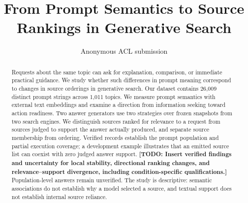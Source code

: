 \documentclass[11pt]{article}
\title{From Prompt Semantics to Source Rankings in Generative Search}
\author{Anonymous ACL submission}
\newcommand{\todo}[1]{\textcolor{black!72}{\textbf{[TODO: #1]}}}
\begin{document}
\maketitle
\begin{abstract}
Requests about the same topic can ask for explanation, comparison, or immediate practical guidance. We study whether such differences in prompt meaning correspond to changes in source orderings in generative search. Our dataset contains 26,009 distinct prompt strings across 1,011 topics. We measure prompt semantics with external text embeddings and examine a direction from information seeking toward action readiness. Two answer generators use two strategies over frozen snapshots from two search engines. We distinguish sources ranked for relevance to a request from sources judged to support the answer actually produced, and separate source membership from ordering. Verified records establish the prompt population and partial execution coverage; a development example illustrates that an emitted source list can coexist with zero judged answer support. \todo{Insert verified findings and uncertainty for local stability, directional ranking changes, and relevance--support divergence, including condition-specific qualifications.} Population-level answers remain unverified. The study is descriptive: semantic associations do not establish why a model selected a source, and textual support does not establish internal source reliance.
\end{abstract}




\appendix

\end{document}
